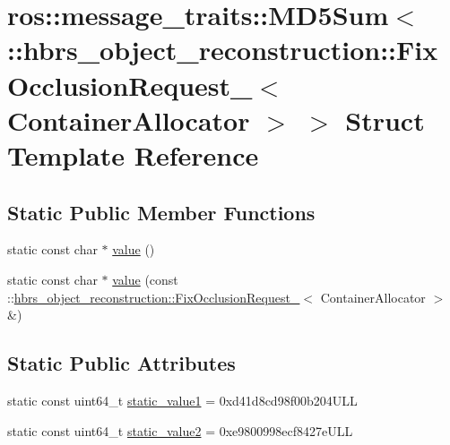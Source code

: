 \hypertarget{structros_1_1message__traits_1_1_m_d5_sum_3_01_1_1hbrs__object__reconstruction_1_1_fix_occlusionfc5eaa692137555a256b57cb60ad53de}{\section{ros\-:\-:message\-\_\-traits\-:\-:\-M\-D5\-Sum$<$ \-:\-:hbrs\-\_\-object\-\_\-reconstruction\-:\-:\-Fix\-Occlusion\-Request\-\_\-$<$ \-Container\-Allocator $>$ $>$ \-Struct \-Template \-Reference}
\label{structros_1_1message__traits_1_1_m_d5_sum_3_01_1_1hbrs__object__reconstruction_1_1_fix_occlusionfc5eaa692137555a256b57cb60ad53de}
}
\subsection*{\-Static \-Public \-Member \-Functions}
\begin{DoxyCompactItemize}
\item 
static const char $\ast$ \hyperlink{structros_1_1message__traits_1_1_m_d5_sum_3_01_1_1hbrs__object__reconstruction_1_1_fix_occlusionfc5eaa692137555a256b57cb60ad53de_a0a25a8d74a2bc3c0460b180d4cff93b6}{value} ()
\item 
static const char $\ast$ \hyperlink{structros_1_1message__traits_1_1_m_d5_sum_3_01_1_1hbrs__object__reconstruction_1_1_fix_occlusionfc5eaa692137555a256b57cb60ad53de_aca807d848d1b810763dbd44f71f3c309}{value} (const \-::\hyperlink{structhbrs__object__reconstruction_1_1_fix_occlusion_request__}{hbrs\-\_\-object\-\_\-reconstruction\-::\-Fix\-Occlusion\-Request\-\_\-}$<$ \-Container\-Allocator $>$ \&)
\end{DoxyCompactItemize}
\subsection*{\-Static \-Public \-Attributes}
\begin{DoxyCompactItemize}
\item 
static const uint64\-\_\-t \hyperlink{structros_1_1message__traits_1_1_m_d5_sum_3_01_1_1hbrs__object__reconstruction_1_1_fix_occlusionfc5eaa692137555a256b57cb60ad53de_a8522079a47ec0bdaefc70822dc15a6bb}{static\-\_\-value1} = 0xd41d8cd98f00b204\-U\-L\-L
\item 
static const uint64\-\_\-t \hyperlink{structros_1_1message__traits_1_1_m_d5_sum_3_01_1_1hbrs__object__reconstruction_1_1_fix_occlusionfc5eaa692137555a256b57cb60ad53de_a1793d697d9c6f2e5d84dcf85edef10e1}{static\-\_\-value2} = 0xe9800998ecf8427e\-U\-L\-L
\end{DoxyCompactItemize}
